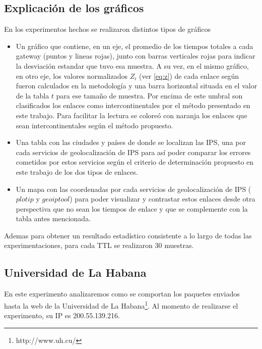 \subsection{Explicación de los gráficos}

En los experimentos hechos se realizaron distintos tipos de gráficos

\begin{itemize}
	\item Un gráfico que contiene, en un eje, el promedio de los tiempos totales
	a cada gateway (puntos y lineas rojas), junto con barras verticales rojas
	para indicar la desviación estandar que tuvo esa muestra. A su vez, en el
	mismo gráfico, en otro eje, los valores normalizados $Z_{i}$ (ver
	\ref{eq:z}) de cada enlace según fueron calculados en la metodología y una
	barra horizontal situada en el valor de la tabla $t$ para ese tamaño de
	muestra.  Por encima de este umbral son clasificados los enlaces como
	intercontinentales por el método presentado en este trabajo.  Para
	facilitar la lectura se coloreó con naranja los enlaces que sean
	intercontinentales según el método propuesto.

	\item Una tabla con las ciudades y países de donde se localizan las IPS,
	una por cada servicios de geolocalización de IPS para así poder comparar
	los errores cometidos por estos servicios según el criterio de
	determinación propuesto en este trabajo de los dos tipos de enlaces.

	\item Un mapa con las coordenadas por cada servicios de geolocalización de
	IPS ($plotip$ y $geoiptool$) para poder visualizar y contrastar estos
	enlaces desde otra perspectiva que no sean los tiempos de enlace y que
	se complemente con la tabla antes mencionada.
\end{itemize}

Ademas para obtener un resultado estadístico consistente a lo largo de todas las
experimentaciones, para cada TTL se realizaron 30 muestras.

\subsection{Universidad de La Habana}

En este experimento analizaremos como se comportan los paquetes enviados hasta
la web de la Universidad de La Habana\footnote{http://www.uh.cu/}. Al momento
de realizarse el experimento, su IP es 200.55.139.216.

